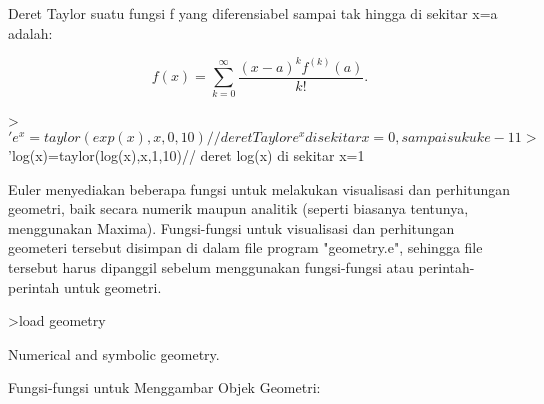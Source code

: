 \documentclass[a4paper,10pt]{article}
\begin{document}
\begin{eulernotebook}
\begin{eulercomment}
\begin{eulercomment}
\begin{eulercomment}
\begin{eulercomment}
\begin{eulercomment}
\begin{eulercomment}
\begin{eulercomment}
\begin{eulercomment}
\begin{eulercomment}
\begin{eulercomment}
\begin{eulercomment}
\begin{eulercomment}
\begin{eulercomment}
\begin{eulercomment}
\begin{eulercomment}
\begin{eulercomment}
\begin{eulercomment}
\begin{eulercomment}
\begin{eulerprompt}
\end{eulerprompt}
\begin{eulercomment}
Deret Taylor suatu fungsi f yang diferensiabel sampai tak hingga di sekitar x=a adalah:

\end{eulercomment}
\begin{eulerformula}
\[
f(x) = \sum_{k=0}^\infty \frac{(x-a)^k f^{(k)}(a)}{k!}.
\]
\end{eulerformula}
\begin{eulerprompt}
>$'e^x =taylor(exp(x),x,0,10) // deret Taylor e^x di sekitar x=0, sampai suku ke-11
>$'log(x)=taylor(log(x),x,1,10)// deret log(x) di sekitar x=1
\end{eulerprompt}
\begin{eulercomment}
Euler menyediakan beberapa fungsi untuk melakukan visualisasi dan perhitungan geometri, baik
secara numerik maupun analitik (seperti biasanya tentunya, menggunakan Maxima).
Fungsi-fungsi untuk visualisasi dan perhitungan geometeri tersebut disimpan di dalam file
program "geometry.e", sehingga file tersebut harus dipanggil sebelum menggunakan
fungsi-fungsi atau perintah-perintah untuk geometri.
\end{eulercomment}
\begin{eulerprompt}
>load geometry
\end{eulerprompt}
\begin{euleroutput}
  Numerical and symbolic geometry.
\end{euleroutput}
\begin{eulercomment}
Fungsi-fungsi untuk Menggambar Objek Geometri:


\end{eulercomment}
\end{eulercomment}
\end{eulercomment}
\end{eulercomment}
\end{eulercomment}
\end{eulercomment}
\end{eulercomment}
\end{eulercomment}
\end{eulercomment}
\end{eulercomment}
\end{eulercomment}
\end{eulercomment}
\end{eulercomment}
\end{eulercomment}
\end{eulercomment}
\end{eulercomment}
\end{eulercomment}
\end{eulercomment}
\end{eulercomment}
\end{eulernotebook}
\end{document}
